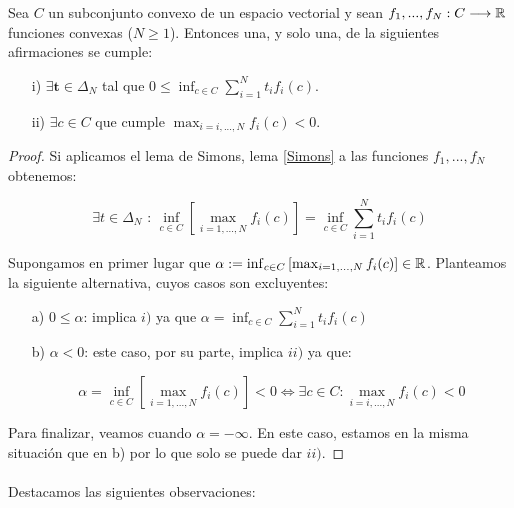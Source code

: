 	\begin{teoremaBox}\label{Gordan}
		Sea $ C $ un subconjunto convexo de un espacio vectorial y sean $ f_1,...,f_N : C \longrightarrow \mathbb{R} $ funciones convexas ($ N \geq 1 $). Entonces una, y solo una, de la siguientes afirmaciones se cumple:
		\begin{itemize}
			\item[i)] $ \exists \mathbf{t} \in \Delta_N $ tal que $ 0 \leq \inf_{c \in C}  \sum_{i=1}^{N}{t_i f_i(c)}$.
			\item[ii)] $ \exists c \in C $ que cumple $ \max_{i=i,...,N}f_i (c) < 0 $.
		\end{itemize}
	\end{teoremaBox}
	\begin{proof}
		Si aplicamos el lema de Simons, lema \ref{Simons} a las funciones $ f_1,...,f_N $ obtenemos:
		
		\begin{equation*}
			\exists t \in \Delta_N \text{ : } \inf_{c \in C}\left[ \max_{i=1,...,N}f_i(c)\right] = \inf_{c \in C} \sum_{i=1}^{N}t_i f_i(c)
		\end{equation*}
		
		Supongamos en primer lugar que $ \alpha := \inf_{c \in C}\left[ \max_{i=1,...,N}f_i(c)\right] \in \mathbb{R} $. Planteamos la siguiente alternativa, cuyos casos son excluyentes:
		\begin{itemize}
			\item[a)] $ 0 \leq \alpha $: implica $ i) $ ya que $ \alpha = \inf_{c \in C} \sum_{i=1}^{N}t_i f_i(c) $ 
			\item[b)] $ \alpha < 0 $: este caso, por su parte, implica $ ii) $ ya que:
			
			\begin{equation*}
				\alpha = \inf_{c \in C}\left[ \max_{i=1,...,N}f_i(c)\right] < 0 \Longleftrightarrow \exists c \in C  : \max_{i=i,...,N}f_i (c) < 0 
			\end{equation*}  
		\end{itemize}
	
		Para finalizar, veamos cuando $ \alpha =-\infty $. En este caso, estamos en la misma situación que en b) por lo que solo se puede dar $ ii) $.
	\end{proof}

	\paragraph{} Destacamos las siguientes observaciones:
	
